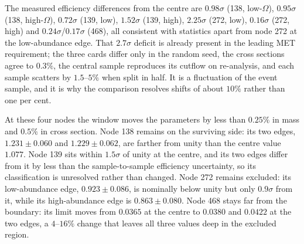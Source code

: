 The measured efficiency differences from the centre are $0.98\sigma$ (138, low-$\Omega$), $0.95\sigma$ (138, high-$\Omega$), $0.72\sigma$ (139, low), $1.52\sigma$ (139, high), $2.25\sigma$ (272, low), $0.16\sigma$ (272, high) and $0.24\sigma$/$0.17\sigma$ (468), all consistent with statistics apart from node 272 at the low-abundance edge. That $2.7\sigma$ deficit is already present in the leading MET requirement; the three cards differ only in the random seed, the cross sections agree to $0.3\%$, the central sample reproduces its cutflow on re-analysis, and each sample scatters by $1.5$--$5\%$ when split in half. It is a fluctuation of the event sample, and it is why the comparison resolves shifts of about $10\%$ rather than one per cent.

At these four nodes the window moves the parameters by less than $0.25\%$ in mass and $0.5\%$ in cross section. Node 138 remains on the surviving side: its two edges, $1.231\pm0.060$ and $1.229\pm0.062$, are farther from unity than the centre value $1.077$. Node 139 sits within $1.5\sigma$ of unity at the centre, and its two edges differ from it by less than the sample-to-sample efficiency uncertainty, so its classification is unresolved rather than changed. Node 272 remains excluded: its low-abundance edge, $0.923\pm0.086$, is nominally below unity but only $0.9\sigma$ from it, while its high-abundance edge is $0.863\pm0.080$. Node 468 stays far from the boundary: its limit moves from $0.0365$ at the centre to $0.0380$ and $0.0422$ at the two edges, a $4$--$16\%$ change that leaves all three values deep in the excluded region.


